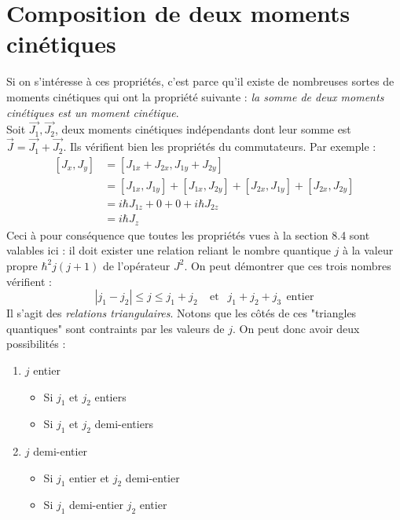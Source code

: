 \documentclass[british,french,11pt, a4paper, openany]{book}
\begin{document}
\section{Composition de deux moments cinétiques}
Si on s'intéresse à ces propriétés, c'est parce qu'il existe de nombreuses sortes
de moments cinétiques qui ont la propriété suivante : \textit{la somme de deux 
	moments cinétiques est un moment cinétique}.\\
Soit $\vec{J_1},\vec{J_2}$, deux moments cinétiques indépendants dont leur 
somme est $\vec{J} = \vec{J_1}+\vec{J_2}$. Ils vérifient bien les propriétés
du commutateurs. Par exemple :
\begin{equation}
	\begin{array}{ll}
		[J_x,J_y] & = [J_{1x}+J_{2x},J_{1y}+J_{2y}]                                                    \\
		& = \left[J_{1x},J_{1y}\right]+\left[J_{1x},J_{2y}\right]+\left[J_{2x},J_{1y}\right] 
		+\left[J_{2x},J_{2y}\right]\\
		& = i\hbar J_{1z } + 0 + 0 + i\hbar J_{2z}                                           \\
		& = i\hbar J_{z}                                                                     
	\end{array}
\end{equation}
Ceci à pour conséquence que toutes les propriétés vues à la section 8.4 sont 
valables ici : il doit exister une relation reliant le nombre quantique $j$ à
la valeur propre $\hbar^2j(j+1)$ de l'opérateur $J^2$. On peut démontrer que 
ces trois nombres vérifient :
\begin{equation}
	|j_1-j_2| \leq j \leq j_1+j_2\ \ \ \ \ \text{et }\ \ j_1+j_2+j_3\ \ \text{entier}
\end{equation}
Il s'agit des \textit{relations triangulaires}. Notons que les côtés de ces 
"triangles quantiques" sont contraints par les valeurs de $j$. On peut donc 
avoir deux possibilités :
\begin{enumerate}
	\item $j$ entier
	\begin{itemize}
		\item Si $j_1$ et $j_2$ entiers
		\item Si $j_1$ et $j_2$ demi-entiers
	\end{itemize}
	\item $j$ demi-entier
	\begin{itemize}
		\item Si $j_1$ entier et $j_2$ demi-entier
		\item Si $j_1$ demi-entier $j_2$ entier
	\end{itemize}
\end{enumerate}
\end{document}
